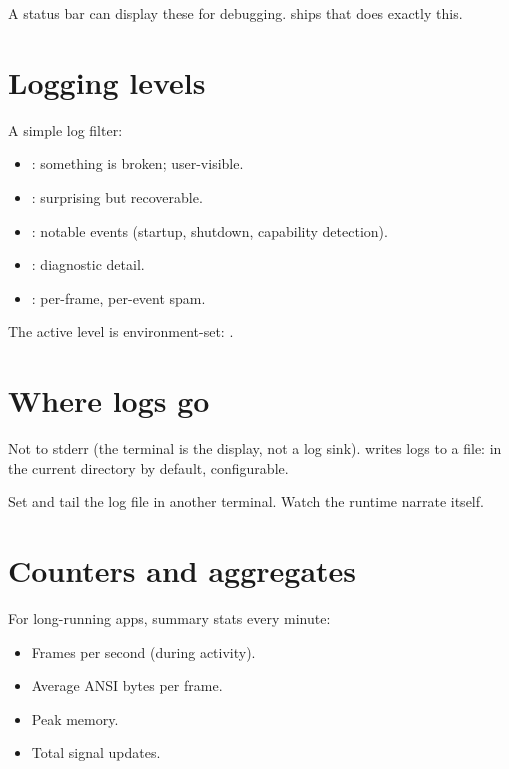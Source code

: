 A status bar can display these for debugging. \maya{} ships
 that does exactly this.

\section{Logging levels}

A simple log filter:

\begin{itemize}[leftmargin=*]
  \item {}: something is broken; user-visible.
  \item {}: surprising but recoverable.
  \item {}: notable events (startup, shutdown,
    capability detection).
  \item {}: diagnostic detail.
  \item {}: per-frame, per-event spam.
\end{itemize}

The active level is environment-set: .

\section{Where logs go}

Not to stderr (the terminal is the display, not a log sink).
\maya{} writes logs to a file:  in the current
directory by default, configurable.

\begin{tryit}
Set  and tail the log file in another
terminal. Watch the runtime narrate itself.
\end{tryit}

\section{Counters and aggregates}

For long-running apps, summary stats every minute:

\begin{itemize}[leftmargin=*]
  \item Frames per second (during activity).
  \item Average ANSI bytes per frame.
  \item Peak memory.
  \item Total signal updates.
\end{itemize}


